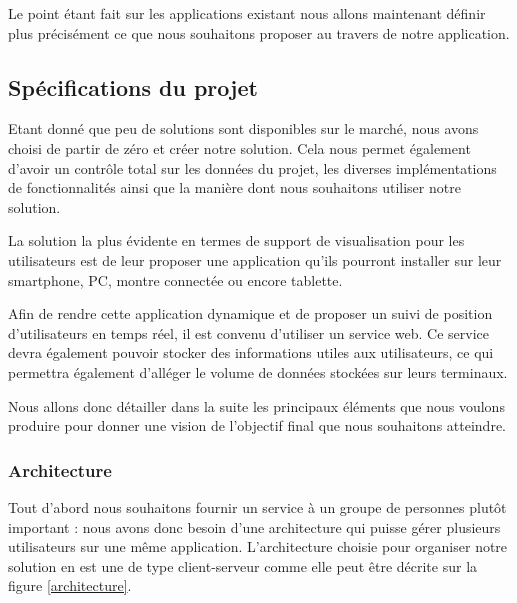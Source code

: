 Le point étant fait sur les applications existant nous allons maintenant définir plus précisément ce que nous souhaitons proposer au travers de notre application.


\subsection{Spécifications du projet}

Etant donné que peu de solutions sont disponibles sur le marché, nous avons choisi de partir de zéro et créer notre solution. Cela nous permet également d'avoir un contrôle total sur les données du projet, les diverses implémentations de fonctionnalités ainsi que la manière dont nous souhaitons utiliser notre solution.

La solution la plus évidente en termes de support de visualisation pour les utilisateurs est de leur proposer une application qu'ils pourront installer sur leur smartphone, PC, montre connectée ou encore tablette.

Afin de rendre cette application dynamique et de proposer un suivi de position d'utilisateurs en temps réel, il est convenu d'utiliser un service web. Ce service devra également pouvoir stocker des informations utiles aux utilisateurs, ce qui permettra également d'alléger le volume de données stockées sur leurs terminaux.

Nous allons donc détailler dans la suite les principaux éléments que nous voulons produire pour donner une vision de l’objectif final que nous souhaitons atteindre.

\subsubsection{Architecture}

Tout d’abord nous souhaitons fournir un service à un groupe de personnes plutôt important : nous avons donc besoin d’une architecture qui puisse gérer plusieurs utilisateurs sur une même application. L'architecture choisie pour organiser notre solution en est une de type client-serveur comme elle peut être décrite sur la figure \ref{architecture}.

